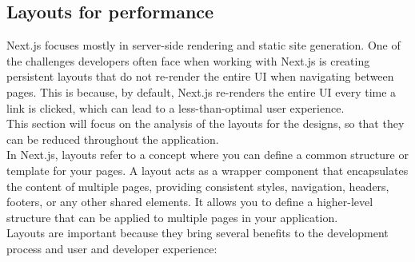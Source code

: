 \documentclass[./memory.tex]{subfiles}
\begin{document}
\subsection{Layouts for performance}
Next.js focuses mostly in server-side rendering and static site generation. One
of the challenges developers often face when working with Next.js is creating
persistent layouts that do not re-render the entire UI when navigating between
pages. This is because, by default, Next.js re-renders the entire UI every time
a link is clicked, which can lead to a less-than-optimal user experience.
\\
This section will focus on the analysis of the layouts for the designs, so that
they can be reduced throughout the application.
\\[8pt]
In Next.js, layouts \cite{nextjs-layouts} refer to a concept where you can define
a common structure or template for your pages. A layout acts as a wrapper
component that encapsulates the content of multiple pages, providing consistent
styles, navigation, headers, footers, or any other shared elements. It allows
you to define a higher-level structure that can be applied to multiple pages in
your application.
\\
Layouts are important because they bring several benefits to the development
process and user and developer experience:
\end{document}
